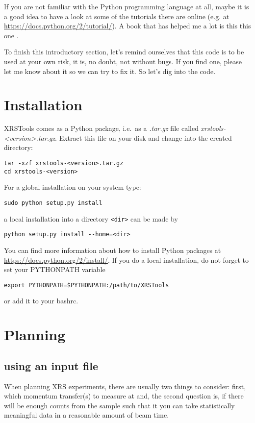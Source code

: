 \documentclass[aps,prl,groupedaddress]{revtex4}
\begin{document}
If you are not familiar with the Python programming language at all, maybe it is a good idea to have a look at some of the tutorials there are online (e.g. at \url{https://docs.python.org/2/tutorial/}). A book that has helped me a lot is this this one \cite{mlhetland}.

To finish this introductory section, let's remind ourselves that this code is to be used at your own risk, it is, no doubt, not without bugs. If you find one, please let me know about it so we can try to fix it. So let's dig into the code.

\section{Installation}
XRSTools comes as a Python package, i.e.~as a \textit{.tar.gz} file called \textit{xrstools-<version>.tar.gz}. Extract this file on your disk and change into the created directory:

\lstset{language=bash}
\begin{lstlisting}[frame=single]
tar -xzf xrstools-<version>.tar.gz
cd xrstools-<version>
\end{lstlisting}

For a global installation on your system type:
\begin{lstlisting}[frame=single]
sudo python setup.py install
\end{lstlisting}

a local installation into a directory \texttt{<dir>} can be made by
\begin{lstlisting}[frame=single]
python setup.py install --home=<dir>
\end{lstlisting}

You can find more information about how to install Python packages at \url{https://docs.python.org/2/install/}. If you do a local installation, do not forget to set your PYTHONPATH variable
\begin{lstlisting}[frame=single]
export PYTHONPATH=$PYTHONPATH:/path/to/XRSTools
\end{lstlisting}
or add it to your bashrc.

\section{Planning}
\subsection{using an input file}
When planning XRS experiments, there are usually two things to consider: first, which momentum transfer(s) to measure at and, the second question is, if there will be enough counts from the sample such that it you can take statistically meaningful data in a reasonable amount of beam time.
\end{document}
